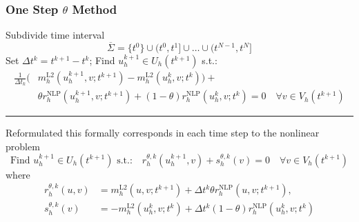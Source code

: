 \documentclass[aspectratio=169,11pt]{beamer}
\theoremstyle{definition}
\begin{document}
\begin{frame}
\frametitle{One Step $\theta$ Method}
Subdivide time interval
\begin{equation*}
\overline{\Sigma} = \{t^{0}\} \cup (t^0,t^1] \cup \ldots \cup (t^{N-1},t^N]
\end{equation*}
Set  $\Delta t^k=t^{k+1}-t^k$;
Find $u_h^{k+1}\in U_h(t^{k+1})$ s.t.:
\begin{equation*}
\begin{split}
\frac{1}{\Delta t_k}(&m_h^\text{L2}(u_h^{k+1},v;t^{k+1})-m_h^\text{L2}(u_h^{k},v;t^{k})) + \\
&\theta r_h^\text{NLP}(u_h^{k+1},v;t^{k+1}) + (1-\theta) r_h^\text{NLP}(u_h^{k},v;t^{k}) = 0
\quad \forall v\in V_h(t^{k+1})
\end{split}
\end{equation*}
\hrule
\smallskip
Reformulated this formally corresponds in each time step to the nonlinear problem
\begin{equation*}
\text{Find $u_h^{k+1}\in U_h(t^{k+1})$ s.t.:}
\quad r_h^{\theta,k} (u_h^{k+1},v) + s_h^{\theta,k}(v) = 0
\quad \forall v\in V_h(t^{k+1})
\end{equation*}
where
\begin{align*}
r^{\theta,k}_h(u,v) &= m_h^\text{L2}(u,v;t^{k+1})+\Delta t^k \theta r_h^\text{NLP}(u,v;t^{k+1}) ,\\
s^{\theta,k}_h(v) &= -m_h^\text{L2}(u^k_h,v;t^k) + \Delta t^k (1-\theta) r_h^\text{NLP}(u_h^k,v;t^k)
\end{align*}
\end{frame}
\end{document}
